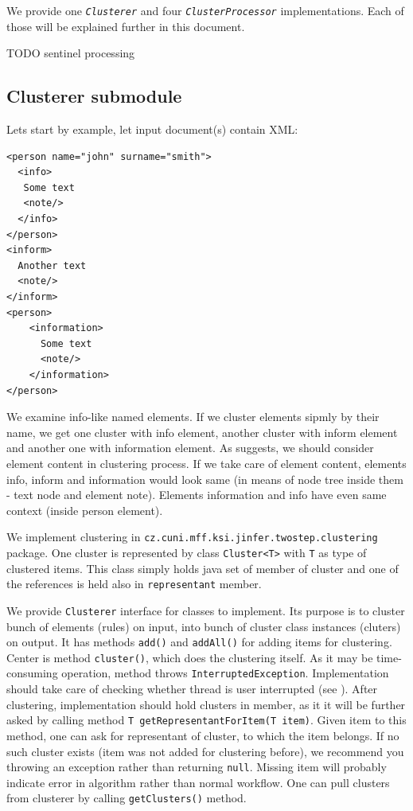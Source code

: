 \documentclass[a4paper,10pt,oneside]{article}
\newcommand{\code}[1]{\texttt{#1}}
\newcommand{\jmodule}[1]{\texttt{\textsl{#1}}}
\begin{document}
We provide one \jmodule{Clusterer} and four \jmodule{ClusterProcessor} implementations.
Each of those will be explained further in this document.

TODO sentinel processing

\subsection{Clusterer submodule}
Lets start by example, let input document(s) contain XML:
\begin{verbatim}
<person name="john" surname="smith">
  <info>
   Some text
   <note/>
  </info>
</person>
<inform>
  Another text
  <note/>
</inform>
<person>
    <information>
      Some text
      <note/>
    </information>
</person>
\end{verbatim}
We examine info-like named elements.
If we cluster elements sipmly by their name, we get one cluster with info element, another cluster with inform element and another one with information element.
As \cite{1802522} suggests, we should consider element content in clustering process.
If we take care of element content, elements info, inform and information would look same (in means of node tree inside them - text node and element note).
Elements information and info have even same context (inside person element).

We implement clustering in \code{cz.cuni.mff.ksi.jinfer.twostep.clustering} package.
One cluster is represented by class \code{Cluster<T>} with \code{T} as type of clustered items.
This class simply holds java set of member of cluster and one of the references is held also in \code{representant} member.

We provide \code{Clusterer} interface for classes to implement.
Its purpose is to cluster bunch of elements (rules) on input, into  bunch of cluster class instances (cluters) on output.
It has methods \code{add()} and \code{addAll()} for adding items for clustering.
Center is method \code{cluster()}, which does the clustering itself.
As it may be time-consuming operation, method throws \code{InterruptedException}.
Implementation should take care of checking whether thread is user interrupted (see \cite[p. 12]{archdoc}).
After clustering, implementation should hold clusters in member, as it it will be further asked by calling method \code{T getRepresentantForItem(T item)}.
Given item to this method, one can ask for representant of cluster, to which the item belongs.
If no such cluster exists (item was not added for clustering before), we recommend you throwing an exception rather than returning \code{null}.
Missing item will probably  indicate error in algorithm rather than normal workflow.
One can pull clusters from clusterer by calling \code{getClusters()} method.
\end{document}
